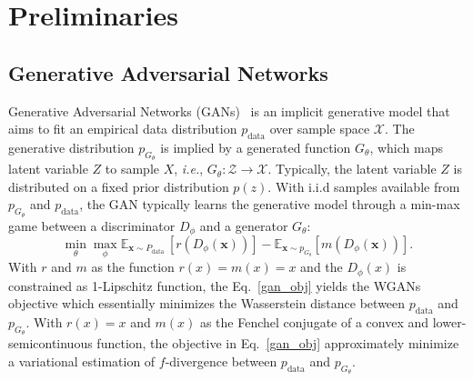 \documentclass{article}
\begin{document}
\section{Preliminaries}
\subsection{Generative Adversarial Networks}
\label{GANs}
Generative Adversarial Networks (GANs)~\cite{goodfellow2014generative} is an implicit generative model that aims to fit an empirical data distribution $p_{\text{data}}$ over sample space $\mathcal{X}$. The generative distribution $p_{G_\theta}$ is implied by a generated function $G_\theta$, which maps latent variable $Z$ to sample $X$, \emph{i.e.}, $G_\theta : \mathcal{Z} \xrightarrow{} \mathcal{X}$. Typically, the latent variable $Z$ is distributed on a fixed  prior distribution $p(z)$. With i.i.d samples available from $p_{G_\theta}$ and $p_{\text{data}}$, the GAN typically learns the generative model through a min-max game between a discriminator $D_\phi$ and a generator $G_\theta$:
\begin{equation}
    \label{gan_obj}
     \min _{\theta} \max _{\phi} \mathbb{E}_{\boldsymbol{x} \sim P_{\text {data }}}\left[r(D_{\phi}(\boldsymbol{x}))\right]-\mathbb{E}_{\boldsymbol{x} \sim p_{G_{\theta}}}\left[m(D_{\phi}(\boldsymbol{x}))\right].
\end{equation}
With $r$ and $m$ as the function $r(x) = m(x) = x$ and the $D_\phi(x)$ is constrained as 1-Lipschitz function, the Eq.~\ref{gan_obj} yields the WGANs objective which essentially minimizes the Wasserstein distance between $p_{\text{data}}$ and $p_{G_\theta}$. 
With $r(x)=x$ and $m(x)$ as the Fenchel conjugate\cite{hiriart2012fundamentals} of a convex and lower-semicontinuous function, the objective in Eq.~\ref{gan_obj} approximately minimize a variational estimation of $f$-divergence\cite{nowozin2016f} between $p_{\text{data}}$ and $p_{G_\theta}$.
\end{document}
